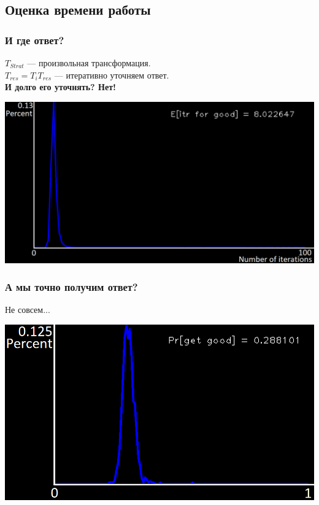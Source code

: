 \documentclass{beamer}
\begin{document}
\subsection{Оценка времени работы}

\begin{frame}
\frametitle{И где ответ?}
	$T_{Strat}$ --- произвольная трансформация.\\
	$T_{res} = T_i T_{res}$ --- итеративно уточняем ответ.\\
	\textbf{И долго его уточнять? Нет!}\\
	
	\centerline{\includegraphics[scale=0.33]{convergence.png}}

\end{frame}


\begin{frame}
	\frametitle{А мы точно получим ответ?}
	Не совсем...
	
	\centerline{\includegraphics[scale=0.6]{probability_good.png}}
	
\end{frame}
\end{document}
